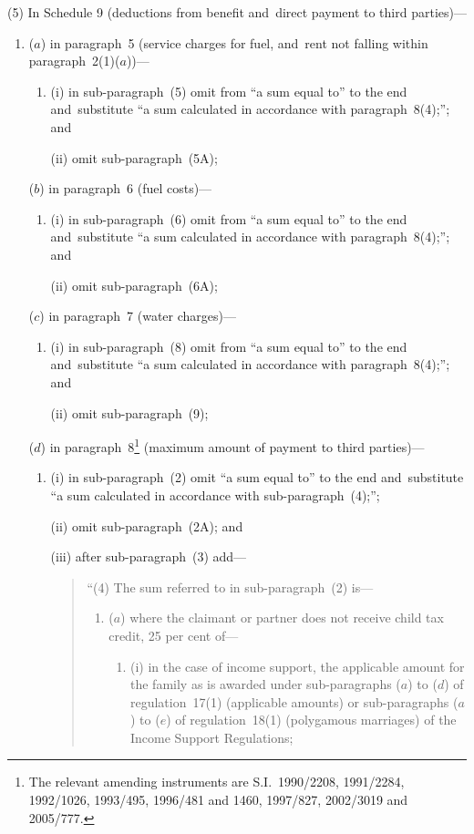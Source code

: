 \documentclass[12pt,a4paper]{article}
\begin{document}
(5) In Schedule 9 (deductions from benefit and~direct payment to third parties)—
\begin{enumerate}\item[]
($a$) in paragraph~5 (service charges for fuel, and~rent not falling within paragraph~2(1)($a$))—
\begin{enumerate}\item[]
(i) in sub-paragraph~(5) omit from “a sum equal to” to the end and~substitute “a sum calculated in accordance with paragraph~8(4);”; and

(ii) omit sub-paragraph~(5A);
\end{enumerate}

($b$) in paragraph~6 (fuel costs)—
\begin{enumerate}\item[]
(i) in sub-paragraph~(6) omit from “a sum equal to” to the end and~substitute “a sum calculated in accordance with paragraph~8(4);”; and

(ii) omit sub-paragraph~(6A);
\end{enumerate}

($c$) in paragraph~7 (water charges)—
\begin{enumerate}\item[]
(i) in sub-paragraph~(8) omit from “a sum equal to” to the end and~substitute “a sum calculated in accordance with paragraph~8(4);”; and

(ii) omit sub-paragraph~(9);
\end{enumerate}

($d$) in paragraph~8\footnote{The relevant amending instruments are S.I.~1990/2208, 1991/2284, 1992/1026, 1993/495, 1996/481 and 1460, 1997/827, 2002/3019 and 2005/777.} (maximum amount of payment to third parties)—
\begin{enumerate}\item[]
(i) in sub-paragraph~(2) omit “a sum equal to” to the end and~substitute “a sum calculated in accordance with sub-paragraph~(4);”;

(ii) omit sub-paragraph~(2A); and

(iii) after sub-paragraph~(3) add—
\begin{quotation}
“(4) The sum referred to in sub-paragraph~(2) is—
\begin{enumerate}\item[]
($a$) where the claimant or partner does not receive child tax credit, 25 per cent of—
\begin{enumerate}\item[]
(i) in the case of income support, the applicable amount for the family as is awarded under sub-paragraphs ($a$)  to ($d$)  of regulation~17(1) (applicable amounts) or sub-paragraphs ($a$)  to ($e$)  of regulation~18(1) (polygamous marriages) of the Income Support Regulations;


\end{enumerate}
\end{enumerate}
\end{quotation}
\end{enumerate}
\end{enumerate}
\end{document}
